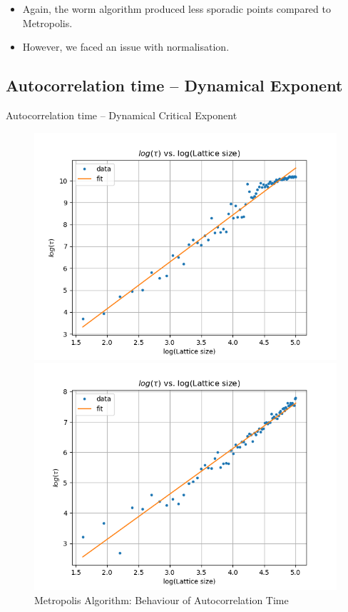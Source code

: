 \documentclass{beamer}
\begin{document}
\begin{frame}
\begin{itemize}
    \item Again, the worm algorithm produced less sporadic points compared to Metropolis.
    \item However, we faced an issue with normalisation.
\end{itemize}
\end{frame}

\subsection{Autocorrelation time – Dynamical Exponent}
\begin{frame}{Autocorrelation time – Dynamical Critical Exponent}    
    \begin{figure}[htbp]
	\begin{center}
		\begin{minipage}[t]{0.49\linewidth}
			\centering
			\includegraphics[width=\linewidth]{metro_dyncritexp.png}
		  \caption{Metropolis Algorithm: Behaviour of Autocorrelation Time}
        \end{minipage}
		\begin{minipage}[t]{0.49\linewidth}
			\centering
			\includegraphics[width=\linewidth]{worm_dyncritexp.png}

\end{minipage}
\end{center}
\end{figure}
\end{frame}
\end{document}
